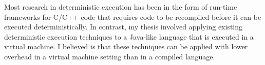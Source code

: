 Most research in deterministic execution has been in the form of
run-time frameworks for C/C++ code that requires code to be recompiled
before it can be executed deterministically.  In contrast, my thesis
involved applying existing deterministic execution techniques to a
Java-like language that is executed in a virtual machine.  I believed
is that these techniques can be applied with lower overhead in a
virtual machine setting than in a compiled language.

